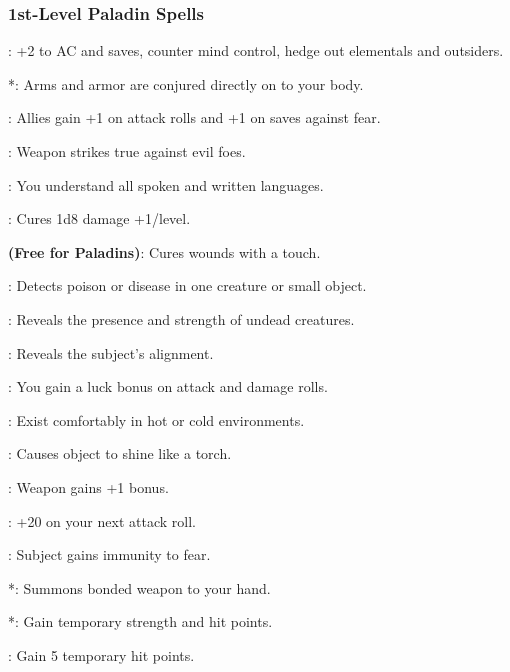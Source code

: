 \subsubsection{1st-Level Paladin Spells}
\begin{list}{}{\leftmargin=1em}
\item {}: +2 to AC and saves, counter mind control, hedge out elementals and outsiders.
\item {}*: Arms and armor are conjured directly on to your body.
\item {}: Allies gain +1 on attack rolls and +1 on saves against fear.
\item {}: Weapon strikes true against evil foes.
\item {}: You understand all spoken and written languages.
\item {}: Cures 1d8 damage +1/level.
\item {} \textbf{(Free for Paladins)}: Cures wounds with a touch.
\item {}: Detects poison or disease in one creature or small object.
\item {}: Reveals the presence and strength of undead creatures.
\item {}: Reveals the subject's alignment.
\item {}: You gain a luck bonus on attack and damage rolls.
\item {}: Exist comfortably in hot or cold environments.
\item {}: Causes object to shine like a torch.
\item {}: Weapon gains +1 bonus.
\item {}: +20 on your next attack roll.
\item {}: Subject gains immunity to fear.
\item {}*: Summons bonded weapon to your hand.
\item {}*: Gain temporary strength and hit points.
\item {}: Gain 5 temporary hit points.
\end{list}
